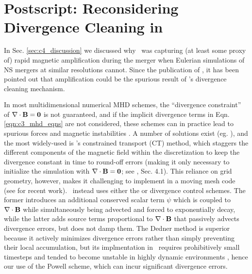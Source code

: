 \section{Postscript: Reconsidering Divergence Cleaning in \arepo}
\label{sec:c4_postscript}

In Sec. \ref{sec:c4_discussion} we discussed why \arepo\ was capturing (at least some proxy of) rapid magnetic amplification during the merger when Eulerian simulations of NS mergers at similar resolutions cannot.  Since the publication of \citeal{zhu+15}, it has been pointed out that amplification could be the spurious result of \arepo's divergence cleaning mechanism.


In most multidimensional numerical MHD schemes, the ``divergence constraint'' of $\bf{\nabla\cdot B} = 0$ is not guaranteed, and if the implicit divergence terms in Eqn. \ref{eqn:c3_mhd_eqns} are not considered, these schemes can in practice lead to spurious forces and magnetic instabilities \citep{toth00, hopkr16}.  A number of solutions exist (eg. \citealt{toth00}), and the most widely-used is \cite{evanh88}'s constrained transport (CT) method, which staggers the different components of the magnetic field within the discretization to keep the divergence constant in time to round-off errors (making it only necessary to initialize the simulation with $\bf{\nabla\cdot B} = 0$; see \citep{toth00}, Sec. 4.1).  This reliance on grid geometry, however, makes it challenging to implement in a moving mesh code (see \citealt{moczvh14} for recent work).  \arepo\ instead uses either the \cite{dedn+02} or \cite{powe+99} divergence control schemes.  The former introduces an additional conserved scalar term $\psi$ which is coupled to $\bf{\nabla\cdot B}$ while simultaneously being advected and forced to exponentially decay, while the latter adds source terms proportional to $\bf{\nabla\cdot B}$ that passively advects divergence errors, but does not damp them.  The Dedner method is superior because it actively minimizes divergence errors rather than simply preventing their local accumulation, but its implmentation in \arepo\ requires prohibitively small timesteps and tended to become unstable in highly dynamic environments \citep{pakms13}, hence our use of the Powell scheme, which can incur significant divergence errors.


